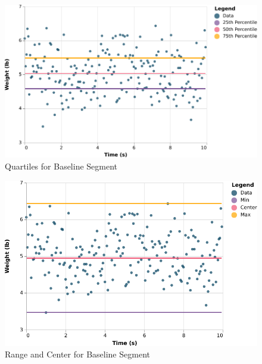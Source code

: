 \begin{figure} \label{figure.baseline.quartiles}
    \centering
    \includegraphics{chart/00-intro/baseline-quartiles.pdf}
    \caption{Quartiles for Baseline Segment}
\end{figure}
\begin{figure} \label{figure.baseline.center}
    \centering
    \includegraphics{chart/00-intro/baseline-min-center-max.pdf}
    \caption{Range and Center for Baseline Segment}
\end{figure}
